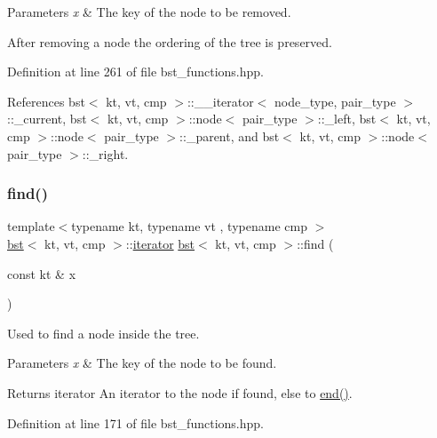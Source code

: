 \begin{DoxyParams}{Parameters}
{\em x} & The key of the node to be removed.\\
\hline
\end{DoxyParams}
After removing a node the ordering of the tree is preserved. 

Definition at line 261 of file bst\+\_\+functions.\+hpp.



References bst$<$ kt, vt, cmp $>$\+::\+\_\+\+\_\+iterator$<$ node\+\_\+type, pair\+\_\+type $>$\+::\+\_\+current, bst$<$ kt, vt, cmp $>$\+::node$<$ pair\+\_\+type $>$\+::\+\_\+left, bst$<$ kt, vt, cmp $>$\+::node$<$ pair\+\_\+type $>$\+::\+\_\+parent, and bst$<$ kt, vt, cmp $>$\+::node$<$ pair\+\_\+type $>$\+::\+\_\+right.

\mbox{\label{classbst_a6c2bdb4e40b2a6871840af57f42765f8}} 
\subsubsection{\texorpdfstring{find()}{find()}\hspace{0.1cm}{\footnotesize\ttfamily [1/2]}}
{\footnotesize\ttfamily template$<$typename kt, typename vt , typename cmp $>$ \\
\hyperlink{classbst}{bst}$<$ kt, vt, cmp $>$\+::\hyperlink{classbst_a429b0445783ff6486882db5dee900ce0}{iterator} \hyperlink{classbst}{bst}$<$ kt, vt, cmp $>$\+::find (\begin{DoxyParamCaption}\item[{const kt \&}]{x }\end{DoxyParamCaption})\hspace{0.3cm}{\ttfamily [noexcept]}}



Used to find a node inside the tree. 


\begin{DoxyParams}{Parameters}
{\em x} & The key of the node to be found. \\
\hline
\end{DoxyParams}
\begin{DoxyReturn}{Returns}
iterator An iterator to the node if found, else to \hyperlink{classbst_aed3a831efc810b5084cb0c9f4adeb16a}{end()}. 
\end{DoxyReturn}


Definition at line 171 of file bst\+\_\+functions.\+hpp.



